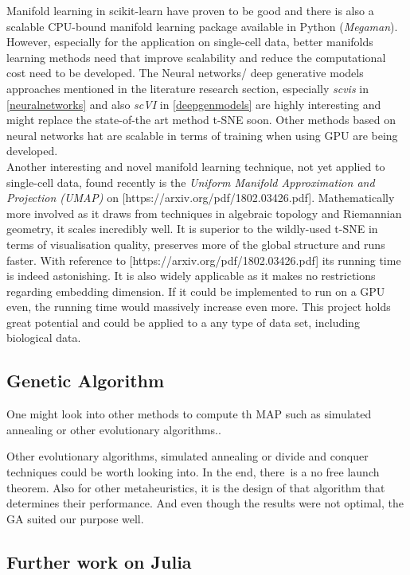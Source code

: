 \documentclass[journal, a4paper]{IEEEtran}
\begin{document}
Manifold learning in scikit-learn have proven to be good and there is also a scalable CPU-bound manifold learning package available in Python (\textit{Megaman}). However, especially for the application on single-cell data, better manifolds learning methods need  that improve scalability and reduce the computational cost need to be developed. The Neural networks/ deep generative models approaches mentioned in the literature research section, especially \textit{scvis} in \ref{neuralnetworks} and also \textit{scVI} in \ref{deepgenmodels} are highly interesting and might replace the state-of-the art method t-SNE soon. Other methods based on neural networks hat are scalable in terms of training when using GPU are being developed.
\\ %
Another interesting and novel manifold learning technique, not yet applied to single-cell data, found recently is the \textit{Uniform Manifold Approximation and Projection (UMAP)} on [https://arxiv.org/pdf/1802.03426.pdf]. Mathematically more involved as it draws from techniques in algebraic topology and Riemannian geometry, it scales incredibly well. It is superior to the wildly-used t-SNE in terms of visualisation quality, preserves more of the global structure and runs faster. With reference to [https://arxiv.org/pdf/1802.03426.pdf] its running time is indeed astonishing. It is also widely applicable as it makes no restrictions regarding embedding dimension. If it could be implemented to run on a GPU even, the running time would massively increase even more. This project holds great potential and could be applied to a any type of data set, including biological data.


\subsection{Genetic Algorithm}

One might look into other methods to compute th MAP such as simulated annealing or other evolutionary algorithms..


Other evolutionary algorithms, simulated annealing or divide and conquer techniques could be worth looking into. In the end, there is a no free launch theorem. Also for other metaheuristics, it is the design of that algorithm that determines their performance. And even though the results were not optimal, the GA suited our purpose well.


\subsection{Further work on Julia}
\end{document}

